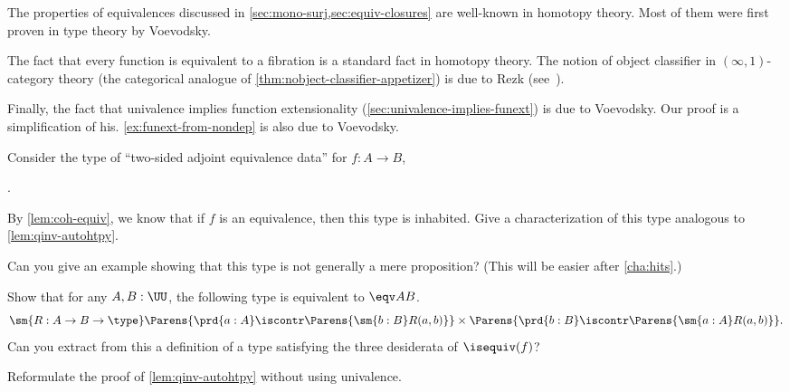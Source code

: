 The properties of equivalences discussed in \cref{sec:mono-surj,sec:equiv-closures} are well-known in homotopy theory.
Most of them were first proven in type theory by Voevodsky.

The fact that every function is equivalent to a fibration is a standard fact in homotopy theory.
The notion of object classifier
%
%
in $(\infty,1)$-category
%
theory (the categorical analogue of \cref{thm:nobject-classifier-appetizer}) is due to Rezk (see~\cite{Rezk05,lurie:higher-topoi}).

Finally, the fact that univalence implies function extensionality (\cref{sec:univalence-implies-funext}) is due to Voevodsky.
Our proof is a simplification of his.
\cref{ex:funext-from-nondep} is also due to Voevodsky.

\sectionExercises

\begin{ex}\label{ex:two-sided-adjoint-equivalences}
  Consider the type of ``two-sided adjoint equivalence data'' for $f:A\to B$,
  \begin{narrowmultline*}
    \narrowbreak
     \times
    .
  \end{narrowmultline*}
  By \cref{lem:coh-equiv}, we know that if $f$ is an equivalence, then this type is inhabited.
  Give a characterization of this type analogous to \cref{lem:qinv-autohtpy}.

  Can you give an example showing that this type is not generally a mere proposition?
  (This will be easier after \cref{cha:hits}.)
\end{ex}

\begin{ex}\label{ex:symmetric-equiv}
  Show that for any $A,B:\UU$, the following type is equivalent to $\eqv A B$.
  \begin{equation*}
    \sm{R:A\to B\to \type}
    \Parens{\prd{a:A} \iscontr\Parens{\sm{b:B} R(a,b)}} \times
    \Parens{\prd{b:B} \iscontr\Parens{\sm{a:A} R(a,b)}}.
  \end{equation*}
  Can you extract from this a definition of a type satisfying the three desiderata of $\isequiv(f)$?
\end{ex}

\begin{ex} \label{ex:qinv-autohtpy-no-univalence}
  Reformulate the proof of \cref{lem:qinv-autohtpy} without using univalence.
\end{ex}

